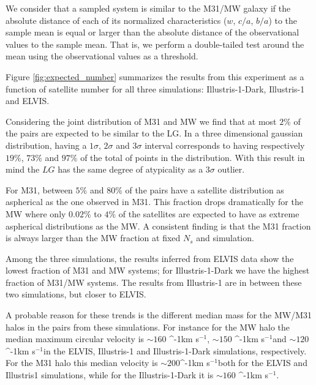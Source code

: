 \documentclass[a4paper,fleqn,usenatbib]{mnras}
\newcommand{\kms}{\ifmmode\mathrm{km\ s}^{-1}\else km s$^{-1}$\fi}
\begin{document}
We consider that a sampled system is similar to the M31/MW galaxy if the
absolute distance of each of its normalized characteristics ($w$, $c/a$, $b/a$) to the
sample mean is equal or larger than the absolute distance of the observational
values to the sample mean.   
That is, we perform a double-tailed test around the mean using the
observational values as a threshold.  

Figure \ref{fig:expected_number} summarizes the results from this
experiment as a function of satellite number for all three simulations:
Illustris-1-Dark, Illustris-1 and ELVIS.

Considering the joint distribution of M31 and MW we find that at most
$2\%$ of the pairs are expected to be similar to the LG.
In a three dimensional gaussian distribution, having a $1\sigma$,
$2\sigma$ and $3\sigma$ interval corresponds to having respectively $19 \%$, $73 \%$ and
$97 \%$ of the total of points in the distribution.
With this result in mind the $LG$ has the same degree of atypicality
as a $3\sigma$ outlier. 

For M31, between $5\%$ and $80\%$ of the pairs have a satellite
distribution as aspherical as the one observed in M31.
This fraction drops
dramatically for the MW where only $0.02\%$ to $4\%$ of the satellites
are expected to have as extreme aspherical distributions as the MW.
A consistent finding is that the M31 fraction is always larger than
the MW fraction at fixed $N_s$ and simulation.

Among the three simulations, the results inferred from ELVIS data show
the lowest fraction of M31 and MW systems; for Illustris-1-Dark we have
the highest fraction of M31/MW systems. 
The results from Illustris-1 are in between these two simulations, but
closer to ELVIS. 

A probable reason for these trends is the different median mass
for the MW/M31 halos in the pairs from these simulations. 
For instance for the MW halo the median maximum circular velocity is
$\sim 160$ \kms, $\sim 150$ \kms and $\sim 120$ \kms in the ELVIS,
Illustris-1 and Illustris-1-Dark simulations, respectively.
For the M31 halo this median velocity is $\sim 200$\kms both for the
ELVIS and Illustris1 simulations, while for the Illustris-1-Dark it is
$\sim 160$ \kms. 
\end{document}
